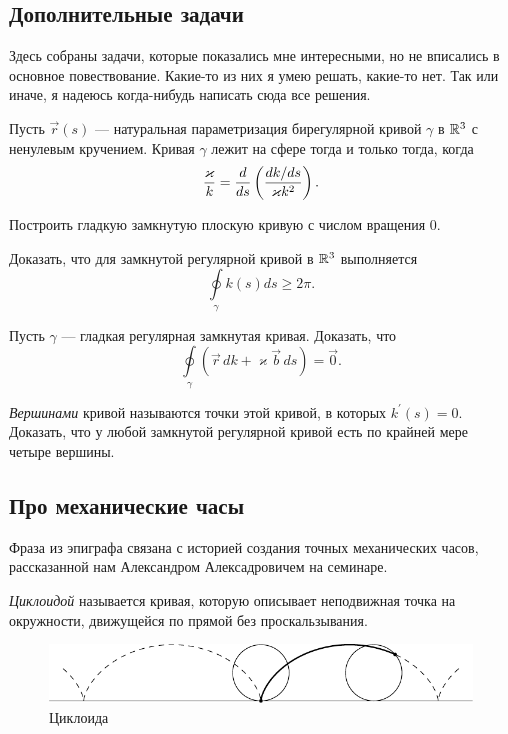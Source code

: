 \subsection{Дополнительные задачи}

Здесь собраны задачи, которые показались мне интересными, но не вписались в основное повествование. Какие-то из них я умею решать, какие-то нет. Так или иначе, я надеюсь когда-нибудь написать сюда все решения.

\begin{problem}
	Пусть $\vec{r}(s)$ --- натуральная параметризация бирегулярной кривой $\gamma$ в $\mathbb{R}^3$ с ненулевым кручением. Кривая $\gamma$ лежит на сфере тогда и только тогда, когда
	\[
		\frac{\varkappa}{k} = \frac{d}{ds}\left(\frac{dk / ds}{\varkappa k^2}\right).
	\]
\end{problem}

\begin{problem}
	Построить гладкую замкнутую плоскую кривую с числом вращения $0$.
\end{problem}

\begin{problem}
	Доказать, что для замкнутой регулярной кривой в $\mathbb{R}^3$ выполняется
	\[
		\oint\limits_{\gamma}k(s)ds \geqslant 2\pi.
	\]
\end{problem}

\begin{problem}
	Пусть $\gamma$ --- гладкая регулярная замкнутая кривая. Доказать, что
	\[
		\oint\limits_{\gamma}(\vec{r}\,dk + \varkappa\vec{b}\,ds) = \vec{0}.
	\]
\end{problem}

\begin{problem}
	\textit{Вершинами} кривой называются точки этой кривой, в которых $k^\prime(s) = 0$. Доказать, что у любой замкнутой регулярной кривой есть по крайней мере четыре вершины.
\end{problem}

\subsection{Про механические часы}

Фраза из эпиграфа связана с историей создания точных механических часов, рассказанной нам Александром Алексадровичем на семинаре.

\textit{Циклоидой} называется кривая, которую описывает неподвижная точка на окружности, движущейся по прямой без проскальзывания.

\begin{figure}[H]
	\centering
	\includegraphics[width=12cm]{./img/Cycloid.pdf}
	\caption{Циклоида}
\end{figure}

